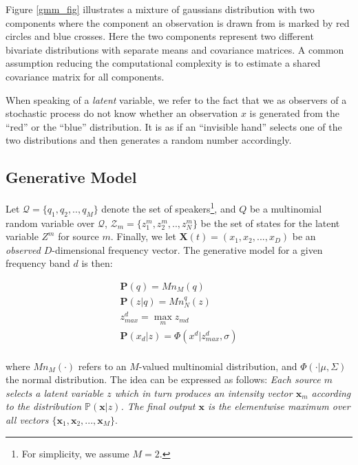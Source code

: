\documentclass[11pt, oneside, a4paper]{report}
\begin{document}
Figure \ref{gmm_fig} illustrates a mixture of gaussians distribution with
two components where the component an observation is drawn from is marked
by red circles and blue crosses. Here the two components represent two different 
bivariate distributions with separate means and covariance matrices. A common 
assumption reducing the computational complexity is to estimate a shared covariance
matrix for all components. 

When speaking of a \emph{latent} variable, we refer to the fact that we as observers of
a stochastic process do not know 
whether an observation $x$ is generated from the ``red'' or the ``blue'' distribution. 
It is as if an ``invisible hand'' selects one of the two distributions and then generates
a random number accordingly. 



\subsection{Generative Model}\label{generative_model}

Let $\mathcal{Q} = \{q_1, q_2, .. , q_M\}$ denote the set of speakers\footnote{For 
simplicity, we assume $M=2$.}, and $Q$ be a multinomial random variable over $\mathcal{Q}$, 
$\mathcal{Z}_m  = \{z_1^m, z_2^m, .. , z_N^m\}$ be the set of states for the latent variable 
$Z^m$ for source $m$. Finally, we let $\boldsymbol{X}(t) = (x_1,x_2,...,x_D)$ be an \emph{observed} 
$D$-dimensional frequency vector. The generative model for a given frequency band $d$ is then:

\begin{equation}
  \label{maxvq_eqn}
  \begin{array}{lcl}
    \mathbf{P}(q)   = Mn_M(q) \\
    \mathbf{P}(z|q) = Mn_N^q(z) \\ 
    z^d_{max} = \max_mz_{md} \\
    \mathbf{P}(x_d|z) = \Phi(x^d|z^d_{max},\sigma) \\
  \end{array}
\end{equation}

where $Mn_M(\cdot)$ refers to an $M$-valued multinomial distribution,
and $\Phi(\cdot|\mu,\Sigma)$ the normal distribution. The idea can be
expressed as follows: \emph{Each source $m$ selects a latent variable
  $z$ which in turn produces an intensity vector $\mathbf{x}_m$
  according to the distribution $\mathbb{P}(\mathbf{x}|z)$. The final
  output $\mathbf{x}$ is the elementwise maximum over all vectors
  $\{\mathbf{x}_1, \mathbf{x}_2, ..., \mathbf{x}_M\}$}.
\end{document}
